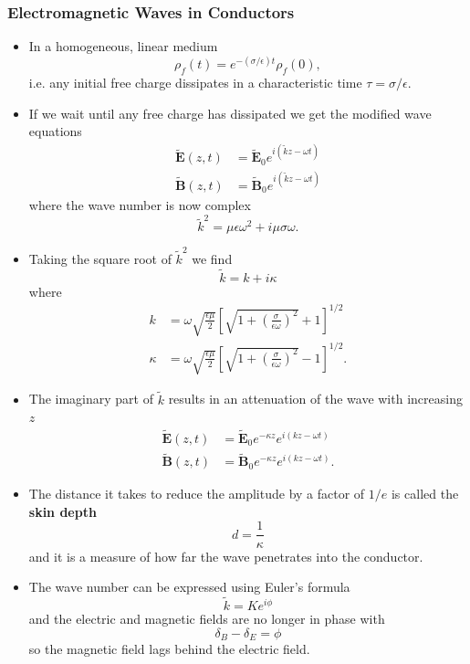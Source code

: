 \documentclass{article}
\renewcommand{\vec}[1]{\boldsymbol{\mathbf{#1}}}
\newcommand{\tvec}[1]{\tilde{\vec{#1}}}
\begin{document}
\subsubsection{Electromagnetic Waves in Conductors}

\begin{itemize}
  \item In a homogeneous, linear medium \[\rho_f(t) = e^{-(\sigma / \epsilon) t} \rho_f(0),\] i.e. any initial free charge dissipates in a characteristic time $\tau = \sigma / \epsilon$.

  \item If we wait until any free charge has dissipated we get the modified wave equations \begin{align*}
          \tvec{E}(z, t) & = \tvec{E}_0 e^{i (\tilde{k} z - \omega t)} \\
          \tvec{B}(z, t) & = \tvec{B}_0 e^{i (\tilde{k} z - \omega t)}
        \end{align*} where the wave number is now complex \[\tilde{k}^2 = \mu \epsilon \omega^2 + i \mu \sigma \omega.\]

  \item Taking the square root of $\tilde{k}^2$ we find \[\tilde{k} = k + i \kappa\] where \begin{align*}
          k      & = \omega \sqrt{\frac{\epsilon \mu}{2}} \left[ \sqrt{1 + \left( \frac{\sigma}{\epsilon \omega} \right)^2} + 1 \right]^{1/2}    \\
          \kappa & = \omega \sqrt{\frac{\epsilon \mu}{2}} \left[ \sqrt{1 + \left( \frac{\sigma}{\epsilon \omega} \right)^2} - 1 \right]^{1 / 2}.
        \end{align*}

  \item The imaginary part of $\tilde{k}$ results in an attenuation of the wave with increasing $z$ \begin{align*}
          \tvec{E}(z, t) & = \tvec{E}_0 e^{-\kappa z} e^{i (k z - \omega t)}  \\
          \tvec{B}(z, t) & = \tvec{B}_0 e^{-\kappa z} e^{i (k z - \omega t)}.
        \end{align*}

  \item The distance it takes to reduce the amplitude by a factor of $1 / e$ is called the \textbf{skin depth} \[d = \frac{1}{\kappa}\] and it is a measure of how far the wave penetrates into the conductor.

  \item The wave number can be expressed using Euler's formula \[\tilde{k} = K e^{i \phi}\] and the electric and magnetic fields are no longer in phase with \[\delta_B - \delta_E = \phi\] so the magnetic field lags behind the electric field.
\end{itemize}
\end{document}
